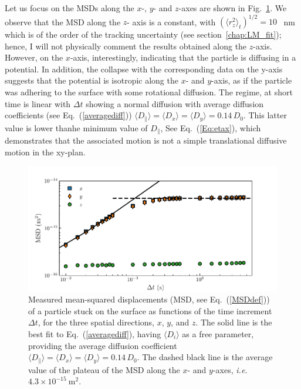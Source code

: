 Let us focus on the \gls{MSD}s along the $x$-, $y$- and $z$-axes are shown in Fig.~\ref{fig.MSD_stucked}. We observe that the \gls{MSD} along the $z$- axis is a constant, with $(\langle r_z^2 \rangle_t)^{1/2} = 10 $~ nm which is of the order of the tracking uncertainty (see section~\ref{chap:LM_fit}); hence, I will not physically comment the results obtained along the $z$-axis. However, on the $x$-axis, interestingly, indicating that the particle is diffusing in a potential. In addition, the collapse with the corresponding data on the y-axis suggests that the potential is isotropic along the $x$- and $y$-axis, as if the particle was adhering to the surface with some rotational diffusion. The regime, at short time is linear with $\Delta t$ showing a normal diffusion with  average diffusion coefficients (see Eq.~(\ref{averagediff}))  $\langle{D_\parallel}\rangle= \langle D_x\rangle=\langle D_y \rangle =0.14\,D_0$. This latter value is lower thanhe minimum value of $D_\parallel$, See Eq.~(\ref{Eq:etax}), which demonstrates that the associated motion is not a simple translational diffusive motion in the xy-plan.



\begin{figure}[H]
	\centering
	\includegraphics{02_body/chapter4/images/stucked_particle/MSD_stucked.pdf}
	\caption{Measured mean-squared displacements (MSD, see Eq.~(\ref{MSDdef})) of a particle stuck on the surface  as functions of the time increment $\Delta t$, for the three spatial directions, $x$, $y$, and $z$. The solid line is the best fit to Eq.~(\ref{averagediff}), having $\langle D_i \rangle$ as a free parameter,
		providing the average diffusion coefficient $\langle{D_\parallel}\rangle= \langle D_x\rangle=\langle D_y \rangle =0.14\,D_0$. The dashed black line is the average value of the plateau of the MSD along the $x$- and $y$-axes, \textit{i.e.} $ 4.3 \times 10 ^{-15} ~ \mathrm{m^2}$.~\href{https://github.com/eXpensia/Confined-Brownian-Motion/blob/main/02_body/chapter4/images/stucked_particle/Full\%20analysis\%20trajectory_using_Dyacine_adding_x_y_distrib.ipynb}{\faGithub}}
	\label{fig.MSD_stucked}
\end{figure}

